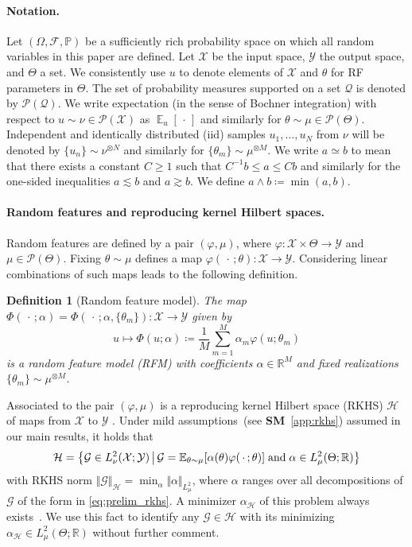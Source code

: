 \documentclass{article}
\theoremstyle{plain}
\theoremstyle{my_def}
\newtheorem{definition}[theorem]{Definition}
\theoremstyle{my_rem}
\numberwithin{equation}{section}
\numberwithin{theorem}{section}%
\newcommand{\R}{\mathbb{R}}
\newcommand{\E}{\mathbb{E}}
\renewcommand{\P}{\mathbb{P}}
\newcommand{\scrP}{\mathscr{P}}
\newcommand{\cF}{\mathcal{F}}
\newcommand{\cG}{\mathcal{G}}
\newcommand{\cH}{\mathcal{H}}
\newcommand{\cQ}{\mathcal{Q}}
\newcommand{\cX}{\mathcal{X}}
\newcommand{\cY}{\mathcal{Y}}
\let\originalleft\left %
\let\originalright\right
\renewcommand{\left}{\mathopen{}\mathclose\bgroup\originalleft}
\renewcommand{\right}{\aftergroup\egroup\originalright}
\newcommand{\set}[2]{{\left\{ #1 \,\middle|\, #2 \right\}}}
\newcommand{\slot}{{\,\cdot\,}}
\newcommand{\defeq}{\coloneqq} %
\newcommand{\mmin}{\wedge} %
\renewcommand{\E}{\operatorname{\mathbb{E}}} %
\newcommand{\U}{{\{u_n\}}}
\newcommand{\Th}{{\{\theta_m\}}}
\renewcommand{\phi}{\varphi}
\begin{document}
\paragraph{Notation.}
Let $(\Omega,\cF,\P)$ be a sufficiently rich probability space on which all random variables in this paper are defined. Let $\cX$ be the input space, $\cY$ the output space, and $\Theta$ a set. We consistently use $u$ to denote elements of $\cX$ and $\theta$ for RF parameters in $\Theta$. The set of probability measures supported on a set $\cQ$ is denoted by $\scrP(\cQ)$. We write expectation (in the sense of Bochner integration) with respect to $u\sim \nu \in \scrP(\cX)$ as $\E_u[\slot]$ and similarly for $\theta\sim \mu \in \scrP(\Theta)$. Independent and identically distributed (iid) samples $u_1,\ldots, u_N$ from $\nu$ will be denoted by $\U\sim\nu^{\otimes N}$ and similarly for $\Th\sim\mu^{\otimes M}$. We write $a\simeq b$ to mean that there exists a constant $C\geq 1$ such that $C^{-1} b \le a \le C b$ and similarly for the one-sided inequalities $a\lesssim b$ and $a\gtrsim b$. We define $a\mmin b\defeq \min(a,b)$. 

\paragraph{Random features and reproducing kernel Hilbert spaces.}
Random features are defined by a pair $(\phi,\mu)$, where $\phi\colon\cX\times\Theta\to\cY$ and $\mu\in\scrP(\Theta)$. Fixing $\theta\sim\mu$ defines a map $\phi(\slot;\theta)\colon\cX\to\cY$. Considering linear combinations of such maps leads to the following definition.
\begin{definition}[Random feature model]\label{def:prelim_rfm}
The map $\Phi(\slot;\alpha)=\Phi(\slot;\alpha,\Th)\colon\cX\to\cY $ given by
\begin{equation}\label{eq:rf_model}
    u\mapsto \Phi(u;\alpha)\defeq \frac{1}{M}\sum_{m=1}^M\alpha_m\phi(u;\theta_m)
\end{equation}
is a \emph{random feature model} (RFM) with coefficients $\alpha\in\R^M$ and fixed realizations $\Th\sim\mu^{\otimes M}$.
\end{definition}

Associated to the pair $(\phi,\mu)$ is a reproducing kernel Hilbert space (RKHS) $\cH$ of maps from $\cX$ to $\cY$ \cite[Sect. 2.3]{rfm}. Under mild assumptions~(see {\bf SM}~\ref{app:rkhs}) assumed in our main results, it holds that
\begin{equation}\label{eq:prelim_rkhs}
    \cH=\set{\cG \in L^2_\nu(\cX;\cY)}{\cG = \E_{\theta\sim\mu}[\alpha(\theta)\phi(\slot;\theta)] \; \text{and} \; \alpha\in L^2_\mu(\Theta;\R)}
\end{equation}
with RKHS norm $\Vert \cG \Vert_{\cH} = \min_{\alpha} \Vert \alpha\Vert_{L^2_\mu}$,
where $\alpha$ ranges over all decompositions of $\cG$ of the form in \eqref{eq:prelim_rkhs}. A minimizer $\alpha_\cH$ of this problem always exists~\cite[Sect. 2.2]{bach2017equivalence}. We use this fact to identify any $\cG \in \cH$ with its minimizing $\alpha_\cH\in L^2_\mu(\Theta;\R)$ without further comment.
\end{document}
